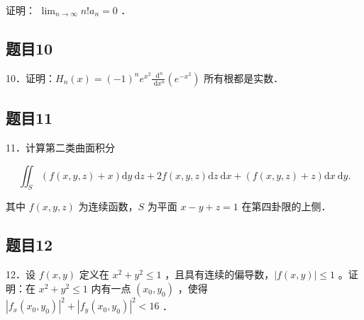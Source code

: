 \documentclass{article}
\begin{document}
证明： \(\lim _{n \rightarrow \infty} n!a_{n}=0\) ．

\subsection{题目10}
10．证明：\(H_{n}(x)=(-1)^{n} e^{x^{2}} \frac{\mathrm{~d}^{n}}{\mathrm{~d} x^{n}}\left(e^{-x^{2}}\right)\) 所有根都是实数．

\subsection{题目11}
11．计算第二类曲面积分

\[
\iint_{S}(f(x, y, z)+x) \mathrm{d} y \mathrm{~d} z+2 f(x, y, z) \mathrm{d} z \mathrm{~d} x+(f(x, y, z)+z) \mathrm{d} x \mathrm{~d} y .
\]

其中 \(f(x, y, z)\) 为连续函数，\(S\) 为平面 \(x-y+z=1\) 在第四卦限的上侧．

\subsection{题目12}
12．设 \(f(x, y)\) 定义在 \(x^{2}+y^{2} \leq 1\) ，且具有连续的偏导数，\(|f(x, y)| \leq 1\) 。证明：在 \(x^{2}+y^{2} \leq 1\) 内有一点 \(\left(x_{0}, y_{0}\right)\) ，使得 \(\left|f_{x}\left(x_{0}, y_{0}\right)\right|^{2}+\left|f_{y}\left(x_{0}, y_{0}\right)\right|^{2}<16\) ．
\end{document}
